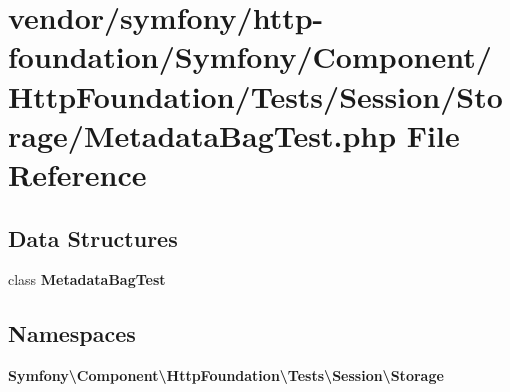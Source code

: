 \section{vendor/symfony/http-\/foundation/\+Symfony/\+Component/\+Http\+Foundation/\+Tests/\+Session/\+Storage/\+Metadata\+Bag\+Test.php File Reference}
\label{_metadata_bag_test_8php}
\subsection*{Data Structures}
\begin{DoxyCompactItemize}
\item 
class {\bf Metadata\+Bag\+Test}
\end{DoxyCompactItemize}
\subsection*{Namespaces}
\begin{DoxyCompactItemize}
\item 
 {\bf Symfony\textbackslash{}\+Component\textbackslash{}\+Http\+Foundation\textbackslash{}\+Tests\textbackslash{}\+Session\textbackslash{}\+Storage}
\end{DoxyCompactItemize}
